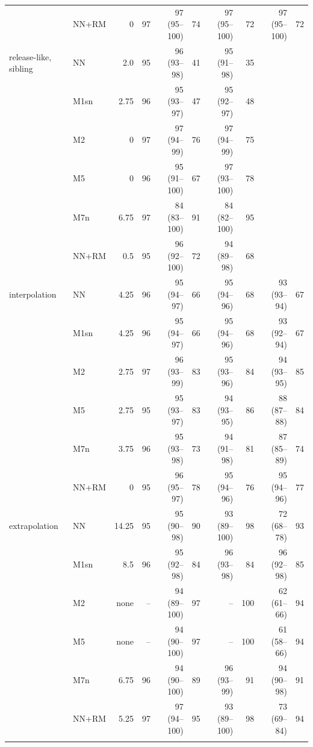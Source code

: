 \documentclass[pdflatex,sn-basic]{sn-jnl}
\begin{document}
\begin{table}[p]
\begin{tabular}{@{}llrrrrrrrr@{}}
 & NN+RM & 0 & 97 & 97 (95--100) & 74 & 97 (95--100) & 72 & 97 (95--100) & 72 \\
release-like, sibling & NN & 2.0 & 95 & 96 (93--98) & 41 & 95 (91--98) & 35 &  & \\
 & M1sn & 2.75 & 96 & 95 (93--97) & 47 & 95 (92--97) & 48 &  & \\
 & M2 & 0 & 97 & 97 (94--99) & 76 & 97 (94--99) & 75 &  & \\
 & M5 & 0 & 96 & 95 (91--100) & 67 & 97 (93--100) & 78 &  & \\
 & M7n & 6.75 & 97 & 84 (83--100) & 91 & 84 (82--100) & 95 &  & \\
 & NN+RM & 0.5 & 95 & 96 (92--100) & 72 & 94 (89--98) & 68 &  & \\
interpolation & NN & 4.25 & 96 & 95 (94--97) & 66 & 95 (94--96) & 68 & 93 (93--94) & 67 \\
 & M1sn & 4.25 & 96 & 95 (94--97) & 66 & 95 (94--96) & 68 & 93 (92--94) & 67 \\
 & M2 & 2.75 & 97 & 96 (93--99) & 83 & 95 (93--96) & 84 & 94 (93--95) & 85 \\
 & M5 & 2.75 & 95 & 95 (93--97) & 83 & 94 (93--95) & 86 & 88 (87--88) & 84 \\
 & M7n & 3.75 & 96 & 95 (93--98) & 73 & 94 (91--98) & 81 & 87 (85--89) & 74 \\
 & NN+RM & 0 & 95 & 96 (95--97) & 78 & 95 (94--96) & 76 & 95 (94--96) & 77 \\
extrapolation & NN & 14.25 & 95 & 95 (90--98) & 90 & 93 (89--100) & 98 & 72 (68--78) & 93 \\
 & M1sn & 8.5 & 96 & 95 (92--98) & 84 & 96 (93--98) & 84 & 96 (92--98) & 85 \\
 & M2 & none & -- & 94 (89--100) & 97 & -- & 100 & 62 (61--66) & 94 \\
 & M5 & none & -- & 94 (90--100) & 97 & -- & 100 & 61 (58--66) & 94 \\
 & M7n & 6.75 & 96 & 94 (90--100) & 89 & 96 (93--99) & 91 & 94 (90--98) & 91 \\
 & NN+RM & 5.25 & 97 & 97 (94--100) & 95 & 93 (89--100) & 98 & 73 (69--84) & 94 \\
\botrule
\end{tabular}
\end{table}
\end{document}
